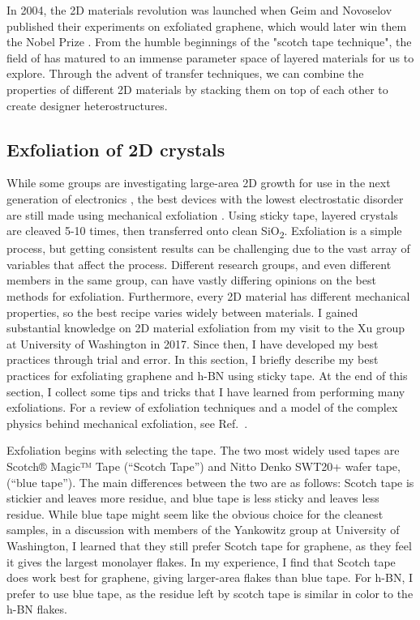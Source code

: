 \documentclass[double,12pt,1in,seploa]{beavtex}
\let\Oldsubsection\subsection
\renewcommand{\subsection}{\FloatBarrier\Oldsubsection}
\begin{document}
In 2004, the 2D materials revolution was launched when Geim and Novoselov published their experiments on exfoliated graphene, which would later win them the Nobel Prize \cite{novoselov_electric_2004}. From the humble beginnings of the "scotch tape technique", the field of has matured to an immense parameter space of layered materials for us to explore. Through the advent of transfer techniques, we can combine the properties of different 2D materials by stacking them on top of each other to create designer heterostructures.

\subsection{Exfoliation of 2D crystals}

While some groups are investigating large-area 2D growth for use in the next generation of electronics \cite{quellmalz_large-area_2021}, the best devices with the lowest electrostatic disorder are still made using mechanical exfoliation \cite{xin_giant_2023}. Using sticky tape, layered crystals are cleaved 5-10 times, then transferred onto clean SiO\textsubscript{2}. Exfoliation is a simple process, but getting consistent results can be challenging due to the vast array of variables that affect the process. Different research groups, and even different members in the same group, can have vastly differing opinions on the best methods for exfoliation. Furthermore, every 2D material has different mechanical properties, so the best recipe varies widely between materials. I gained substantial knowledge on 2D material exfoliation from my visit to the Xu group at University of Washington in 2017. Since then, I have developed my best practices through trial and error. In this section, I briefly describe my best practices for exfoliating graphene and h-BN using sticky tape. At the end of this section, I collect some tips and tricks that I have learned from performing many exfoliations. For a review of exfoliation techniques and a model of the complex physics behind mechanical exfoliation, see Ref.\ \cite{islam_exfoliation_2022}.

Exfoliation begins with selecting the tape. The two most widely used tapes are Scotch® Magic™ Tape (“Scotch Tape”) and Nitto Denko SWT20+ wafer tape, (“blue tape”). The main differences between the two are as follows: Scotch tape is stickier and leaves more residue, and blue tape is less sticky and leaves less residue. While blue tape might seem like the obvious choice for the cleanest samples, in a discussion with members of the Yankowitz group at University of Washington, I learned that they still prefer Scotch tape for graphene, as they feel it gives the largest monolayer flakes. In my experience, I find that Scotch tape does work best for graphene, giving larger-area flakes than blue tape. For h-BN, I prefer to use blue tape, as the residue left by scotch tape is similar in color to the h-BN flakes.
\end{document}
